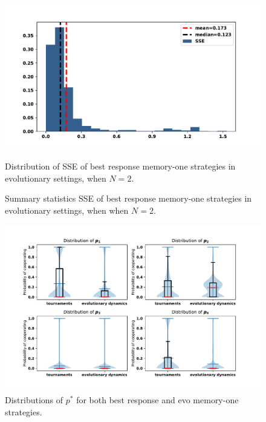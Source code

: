 \documentclass[10pt]{article}
\begin{document}
\begin{figure}[!htbp]
    \begin{minipage}{0.72\textwidth}
            \begin{center}
            \includegraphics[width=\linewidth]{img/evo_sserror.pdf}
            \end{center}
            \caption{Distribution of SSE of best response memory-one strategies in
            evolutionary settings, when \(N=2\).}
            \label{fig:sserror_mem_one}
    \end{minipage}\hspace{1cm}
    \begin{minipage}{0.21\textwidth}
        \centering
        \captionsetup{type=table}
        \resizebox{.85\columnwidth}{!}{%
            }
            \caption{Summary statistics SSE of best response memory-one strategies in
            evolutionary settings, when when \(N=2\).}
            \label{table:sserror_stats}
      \end{minipage}
\end{figure}

\begin{figure}[!htbp]
    \centering
    \includegraphics[width=.8\textwidth]{img/behaviour_violin_plots.pdf}
    \caption{Distributions of \(p^*\) for both best response and evo memory-one
    strategies.}
    \label{fig:behaviour_violin_plots}
\end{figure}
\end{document}
